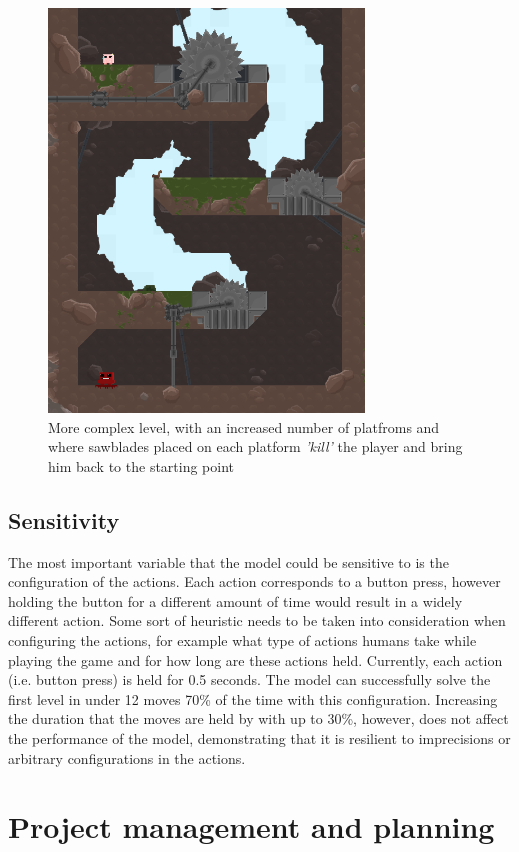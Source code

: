 \documentclass[10pt]{article}
\begin{document}
    \begin{figure}[ht!]
    \centering
    \includegraphics[width=84mm]{./bladeLevelLong.png}
    \caption{More complex level, with an increased number of platfroms and where sawblades placed on each platform \textit{'kill'} the player and bring him back to the starting point}
    \label{fig:complexLevel}
    \end{figure}

    \subsection{Sensitivity}

    The most important variable that the model could be sensitive to is the configuration of the actions. Each action corresponds to a button press, however holding the button for a different amount of time would result in a widely different action. Some sort of heuristic needs to be taken into consideration when configuring the actions, for example what type of actions humans take while playing the game and for how long are these actions held. Currently, each action (i.e. button press) is held for 0.5 seconds. The model can successfully solve the first level in under 12 moves 70\% of the time with this configuration. Increasing the duration that the moves are held by with up to 30\%, however, does not affect the performance of the model, demonstrating that it is resilient to imprecisions or arbitrary configurations in the actions.

    \section{Project management and planning}
\end{document}

